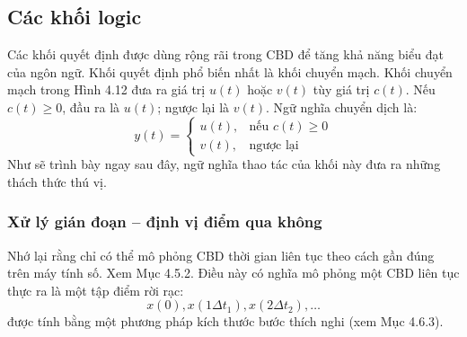 \subsection{Các khối logic}
Các khối quyết định được dùng rộng rãi trong CBD để tăng khả năng biểu đạt của ngôn ngữ. Khối quyết định phổ biến nhất là khối chuyển mạch. Khối chuyển mạch trong Hình 4.12 đưa ra giá trị $u(t)$ hoặc $v(t)$ tùy giá trị $c(t)$. Nếu $c(t)\ge0$, đầu ra là $u(t)$; ngược lại là $v(t)$. Ngữ nghĩa chuyển dịch là:
\[y(t)=\begin{cases}u(t),&\text{nếu }c(t)\ge0\\v(t),&\text{ngược lại}\end{cases}\]
Như sẽ trình bày ngay sau đây, ngữ nghĩa thao tác của khối này đưa ra những thách thức thú vị.

\subsubsection{Xử lý gián đoạn -- định vị điểm qua không}
Nhớ lại rằng chỉ có thể mô phỏng CBD thời gian liên tục theo cách gần đúng trên máy tính số. Xem Mục 4.5.2. Điều này có nghĩa mô phỏng một CBD liên tục thực ra là một tập điểm rời rạc:
\[x(0),x(1\Delta t_1),x(2\Delta t_2),\ldots\]
được tính bằng một phương pháp kích thước bước thích nghi (xem Mục 4.6.3).

